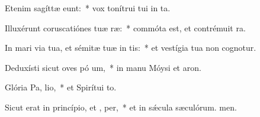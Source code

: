 \item Etenim sagíttæ  eunt:~* vox tonítrui tui in ta.
\item Illuxérunt coruscatiónes tuæ  ræ:~* commóta est, et contrémuit ra.
\item In mari via tua, et sémitæ tuæ in  tis:~* et vestígia tua non cognotur.
\item Deduxísti sicut oves pó um,~* in manu Móysi et aron.
\item Glória Pa,  lio,~* et Spirítui to.
\item Sicut erat in princípio, et ,  per,~* et in sǽcula sæculórum. men.
